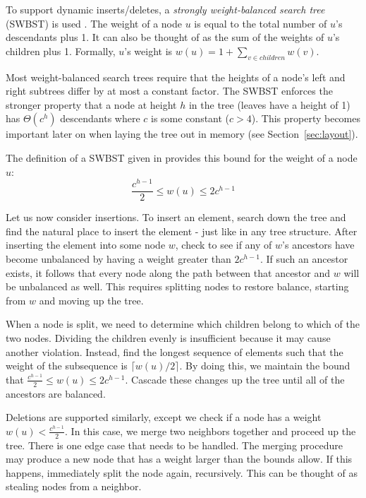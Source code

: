 \documentclass[preprint]{style}
\begin{document}
To support dynamic inserts/deletes, a \textit{strongly weight-balanced search
tree} (SWBST) is used \cite{swbst}.  The weight of a node $u$ is equal to the
total number of $u$'s descendants plus 1. It can also be thought of as the sum
of the weights of $u$'s children plus 1. Formally, $u$'s weight is $w(u) = 1 +
\sum_{v \in children} w(v)$.

Most weight-balanced search trees require that the heights of a node's left and
right subtrees differ by at most a constant factor. The SWBST enforces the
stronger property that a node at height $h$ in the tree (leaves have a height
of 1) has $\Theta(c^h)$ descendants where $c$ is some constant ($c > 4$). This
property becomes important later on when laying the tree out in memory (see
Section~\ref{sec:layout}).

The definition of a SWBST given in \cite{swbst} provides this bound for the
weight of a node $u$:
\begin{equation}
  \frac{c^{h-1}}{2} \leq w(u) \leq 2c^{h-1}
\end{equation}

Let us now consider insertions. To insert an element, search
down the tree and find the natural place to insert the element - just like in
any tree structure. After inserting the element into some node $w$, 
check to see if any of $w$'s ancestors have become unbalanced by having a
weight greater than $2c^{h-1}$. If such an ancestor exists, it follows that
every node along the path between that ancestor and $w$ will be unbalanced as
well. This requires splitting nodes to restore balance, starting from $w$
and moving up the tree.

When a node is split, we need to determine which children belong to which of
the two nodes. Dividing the children evenly is insufficient because it may
cause another violation. Instead, find the longest sequence of elements such
that the weight of the subsequence is $\lceil w(u)/2 \rceil$.  By doing this,
we maintain the bound that $\frac{c^{h-1}}{2} \leq w(u) \leq 2c^{h-1}$. Cascade
these changes up the tree until all of the ancestors are balanced.

Deletions are supported similarly, except we check if a node has a weight $w(u)
< \frac{c^{h-1}}{2}$. In this case, we merge two neighbors together and proceed
up the tree. There is one edge case that needs to be handled. The merging
procedure may produce a new node that has a weight larger than the bounds
allow. If this happens, immediately split the node again, recursively. This can
be thought of as stealing nodes from a neighbor.
\end{document}
